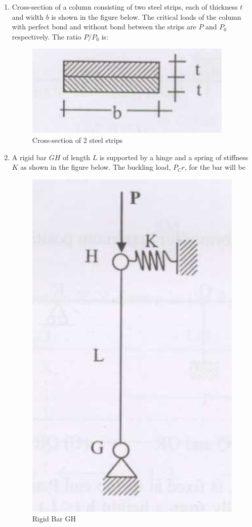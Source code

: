 \documentclass[journal]{IEEEtran}
\begin{document}
\begin{enumerate}
\item Cross-section of a column consisting of two steel strips, each of thickness $t$ and width $b$ is shown in the figure below. The critical loads of the column with perfect bond and without bond between the strips are $P$ and $P_0$ respectively. The ratio $P/P_0$ is: \hfill {}

\begin{figure}[H]
    \centering
    \includegraphics[width=0.3\columnwidth]{figs/fig14.png} 
    \caption{Cross-section of 2 steel strips}
    \label{fig:placeholder}
\end{figure}

\begin{enumerate}
\end{enumerate}

\item A rigid bar $GH$ of length $L$ is supported by a hinge and a spring of stiffness $K$ as shown in the figure below. The buckling load, $P_Cr$, for the bar will be  \hfill {}

\begin{figure}[H]
    \centering
    \includegraphics[width=0.2\columnwidth]{figs/fig15.png} 
    \caption{Rigid Bar GH}
    \label{fig:placeholder}
\end{figure}
\begin{enumerate}
\end{enumerate}




\end{enumerate}
\end{document}
